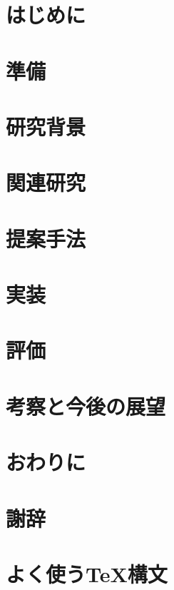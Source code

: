 \documentclass[10pt]{jreport}
\begin{document}
\maketitle


\clearpage
\tableofcontents
\clearpage



\chapter{はじめに}

\clearpage

\chapter{準備}

\clearpage

\chapter{研究背景}

\clearpage

\chapter{関連研究}

\clearpage

\chapter{提案手法}

\clearpage

\chapter{実装}

\clearpage

\chapter{評価}

\clearpage

\chapter{考察と今後の展望}

\clearpage

\chapter{おわりに}

\clearpage

\chapter*{謝辞}

\clearpage

\renewcommand{\bibname}{参考文献}


\clearpage

\appendix
\chapter{よく使うTeX構文}

\end{document}
